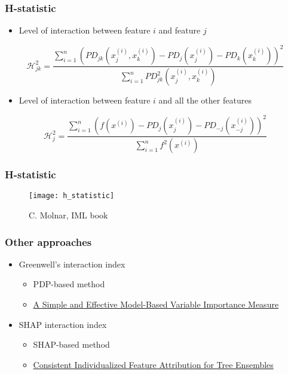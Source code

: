 \begin{frame}
  \frametitle{H-statistic}
  \begin{itemize}
  \item Level of interaction between feature \(i\) and feature \(j\)
  \end{itemize}

  \[ \mathcal{H}^2_{jk} = \frac{\sum_{i=1}^n \left ( PD_{jk}(x^{(i)}_j, x^{(i)}_k) - PD_{j}(x^{(i)}_j) - PD_{k}(x^{(i)}_k)\right )^2 }{\sum_{i=1}^n PD^2_{jk}(x^{(i)}_j, x^{(i)}_k) } \]

  \begin{itemize}
  \item Level of interaction between feature \(i\) and all the other features
  \end{itemize}

    \[ \mathcal{H}^2_{j} = \frac{\sum_{i=1}^n \left ( f(x^{(i)}) - PD_{j}(x^{(i)}_j) - PD_{-j}(x^{(i)}_{-j})\right )^2 }{\sum_{i=1}^n f^2(x^{(i)}) } \]


\end{frame}


\begin{frame}
  \frametitle{H-statistic}
   \begin{figure}
     \texttt{[image: h\_statistic]}
     \caption{\footnotesize C. Molnar, IML book}
   \end{figure}

\end{frame}


\begin{frame}
  \frametitle{Other approaches}
  \begin{itemize}
  \item Greenwell's interaction index
    \begin{itemize}
    \item PDP-based method
      \item \href{https://arxiv.org/pdf/1805.04755.pdf}{A Simple and Effective Model-Based Variable Importance Measure}
    \end{itemize}
  \item SHAP interaction index
    \begin{itemize}
    \item SHAP-based method
    \item \href{https://arxiv.org/abs/1802.03888}{Consistent Individualized Feature Attribution for Tree Ensembles}
    \end{itemize}
  \end{itemize}
\end{frame}
